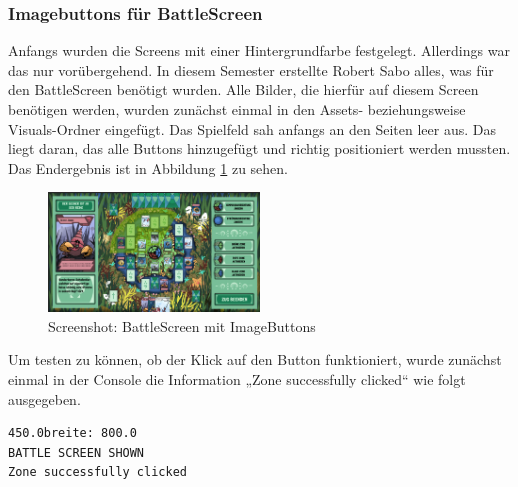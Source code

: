 \subsubsection{Imagebuttons für BattleScreen}
Anfangs wurden die Screens mit einer Hintergrundfarbe festgelegt. 
Allerdings war das nur vorübergehend. In diesem Semester erstellte Robert Sabo alles, was für den BattleScreen benötigt wurden.
Alle Bilder, die hierfür auf diesem Screen benötigen werden, wurden zunächst einmal in den Assets- beziehungsweise Visuals-Ordner eingefügt. Das Spielfeld sah anfangs an den Seiten leer aus. Das liegt daran, das alle Buttons hinzugefügt und richtig positioniert werden mussten. Das Endergebnis ist in Abbildung \ref{fig:Screenshot: BattleScreen mit ImageButtons} zu sehen.
\begin{figure}
\centering
\includegraphics[width=0.5\textwidth]{../img/screenshot_battlescreen_buttons.PNG}
\caption{Screenshot: BattleScreen mit ImageButtons}
\label{fig:Screenshot: BattleScreen mit ImageButtons}
\end{figure}
Um testen zu können, ob der Klick auf den Button funktioniert, wurde zunächst einmal in der Console die Information „Zone successfully clicked“ wie folgt ausgegeben. \\
\begin{lstlisting}
450.0breite: 800.0
BATTLE SCREEN SHOWN
Zone successfully clicked
\end{lstlisting}

